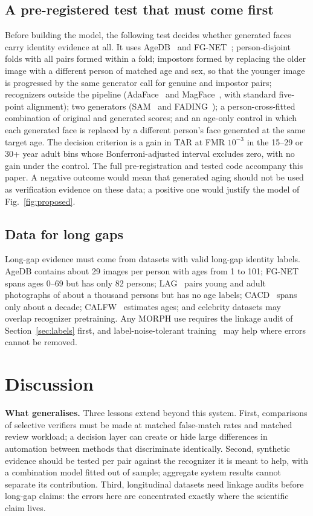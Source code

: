\documentclass[journal]{IEEEtran}
\begin{document}


\subsection{A pre-registered test that must come first}
Before building the model, the following test decides whether generated faces carry identity evidence at all. It uses AgeDB~\cite{moschoglou2017agedb} and FG-NET~\cite{lanitis2002fgnet}; person-disjoint folds with all pairs formed within a fold; impostors formed by replacing the older image with a different person of matched age and sex, so that the younger image is progressed by the same generator call for genuine and impostor pairs; recognizers outside the pipeline (AdaFace~\cite{kim2022adaface} and MagFace~\cite{meng2021magface}, with standard five-point alignment); two generators (SAM~\cite{alaluf2021sam} and FADING~\cite{chen2023fading}); a person-cross-fitted combination of original and generated scores; and an age-only control in which each generated face is replaced by a different person's face generated at the same target age. The decision criterion is a gain in TAR at FMR $10^{-3}$ in the 15--29 or 30+ year adult bins whose Bonferroni-adjusted interval excludes zero, with no gain under the control. The full pre-registration and tested code accompany this paper. A negative outcome would mean that generated aging should not be used as verification evidence on these data; a positive one would justify the model of Fig.~\ref{fig:proposed}.

\subsection{Data for long gaps}
Long-gap evidence must come from datasets with valid long-gap identity labels. AgeDB contains about 29 images per person with ages from 1 to 101; FG-NET spans ages 0--69 but has only 82 persons; LAG~\cite{bianco2017lag} pairs young and adult photographs of about a thousand persons but has no age labels; CACD~\cite{chen2014cacd} spans only about a decade; CALFW~\cite{zheng2017calfw} estimates ages; and celebrity datasets may overlap recognizer pretraining. Any MORPH use requires the linkage audit of Section~\ref{sec:labels} first, and label-noise-tolerant training~\cite{deng2020subcenter} may help where errors cannot be removed.

\section{Discussion}
\textbf{What generalises.} Three lessons extend beyond this system. First, comparisons of selective verifiers must be made at matched false-match rates and matched review workload; a decision layer can create or hide large differences in automation between methods that discriminate identically. Second, synthetic evidence should be tested per pair against the recognizer it is meant to help, with a combination model fitted out of sample; aggregate system results cannot separate its contribution. Third, longitudinal datasets need linkage audits before long-gap claims: the errors here are concentrated exactly where the scientific claim lives.
\end{document}
